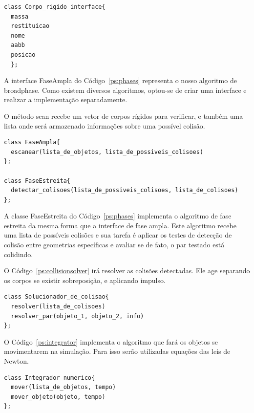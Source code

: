 \begin{lstlisting}[frame=single,caption=Modelagem prévia para interface de corpo rígido\label{ps:rigidbody}]
class Corpo_rigido_interface{
  massa
  restituicao
  nome
  aabb
  posicao
  };
\end{lstlisting}


A interface FaseAmpla do Código~\ref{ps:phases} representa o nosso algoritmo de broadphase. Como existem diversos algoritmos, optou-se de criar uma interface e realizar a implementação separadamente.

O método scan recebe um vetor de corpos rígidos para verificar, e também uma lista onde será armazenado informações sobre uma possível colisão.

\begin{lstlisting}[frame=single,caption=Modelagem prévia para fase ampla e estreita\label{ps:phases}]
class FaseAmpla{
  escanear(lista_de_objetos, lista_de_possiveis_colisoes)
};

class FaseEstreita{
  detectar_colisoes(lista_de_possiveis_colisoes, lista_de_colisoes)
};
\end{lstlisting}

A classe FaseEstreita do Código~\ref{ps:phases} implementa o algoritmo de fase estreita da mesma forma que a interface de fase ampla. Este algoritmo recebe uma lista de possíveis colisões e sua tarefa é aplicar os testes de detecção de colisão entre geometrias específicas e avaliar se de fato, o par testado está colidindo.

O Código~\ref{ps:collisionsolver} irá resolver as colisões detectadas. Ele age separando os corpos se existir sobreposição, e aplicando impulso.
\begin{lstlisting}[frame=single,caption=Modelagem prévia para solucionador de colisões\label{ps:collisionsolver}]
class Solucionador_de_colisao{
  resolver(lista_de_colisoes)
  resolver_par(objeto_1, objeto_2, info)
};
\end{lstlisting}

O Código~\ref{ps:integrator} implementa o algoritmo que fará os objetos se movimentarem na simulação. Para isso serão utilizadas equações das leis de Newton.

\begin{lstlisting}[frame=single,caption=Modelagem prévia para integrador numérico\label{ps:integrator}]
class Integrador_numerico{
  mover(lista_de_objetos, tempo)
  mover_objeto(objeto, tempo)
};
\end{lstlisting}



